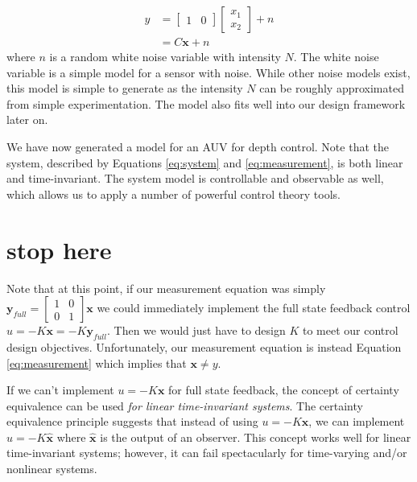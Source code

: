 \documentclass{article}
\begin{document}
\begin{equation}
\begin{split}
\label{eq:measurement}
y&=\begin{bmatrix} 1 & 0 \end{bmatrix} \begin{bmatrix} x_1 \\ x_2 \end{bmatrix} + n \\
&=C\pmb{x}+n
\end{split}
\end{equation}
where $n$ is a random white noise variable with intensity $N$.  The white noise variable is a simple model for a sensor with noise.  While other noise models exist, this model is simple to generate as the intensity $N$ can be roughly approximated from simple experimentation.  The model also fits well into our design framework later on.

We have now generated a model for an AUV for depth control.  Note that the system, described by Equations \ref{eq:system} and \ref{eq:measurement}, is both linear and time-invariant.  The system model is controllable and observable as well, which allows us to apply a number of powerful control theory tools.

\section{stop here}

Note that at this point, if our measurement equation was simply $\pmb{y}_{full}=\begin{bmatrix} 1 & 0 \\ 0 & 1 \end{bmatrix} \pmb{x}$ we could immediately implement the full state feedback control $u=-K\pmb{x}=-K\pmb{y}_{full}$.  Then we would just have to design $K$ to meet our control design objectives.  Unfortunately, our measurement equation is instead Equation \ref{eq:measurement} which implies that $\pmb{x}\neq y$.

If we can't implement $u=-K\pmb{x}$ for full state feedback, the concept of certainty equivalence can be used \emph{for linear time-invariant systems}.  The certainty equivalence principle suggests that instead of using $u=-K\pmb{x}$, we can implement $u=-K\pmb{\hat{x}}$ where $\pmb{\hat{x}}$ is the output of an observer.  This concept works well for linear time-invariant systems; however, it can fail spectacularly for time-varying and/or nonlinear systems.
\end{document}
